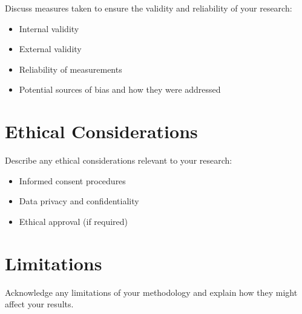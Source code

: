 Discuss measures taken to ensure the validity and reliability of your research:
\begin{itemize}
    \item Internal validity
    \item External validity
    \item Reliability of measurements
    \item Potential sources of bias and how they were addressed
\end{itemize}

\section{Ethical Considerations}

Describe any ethical considerations relevant to your research:
\begin{itemize}
    \item Informed consent procedures
    \item Data privacy and confidentiality
    \item Ethical approval (if required)
\end{itemize}

\section{Limitations}

Acknowledge any limitations of your methodology and explain how they might affect your results.
